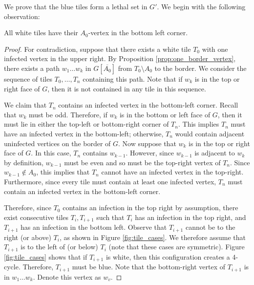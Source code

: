 We prove that the blue tiles form a lethal set in $G'$. We begin with the following observation:

\begin{prop}
\label{prop:bottom_left}
All white tiles have their $A_0$-vertex in the bottom left corner.
\end{prop}

\begin{proof}
For contradiction, suppose that there exists a white tile $T_0$ with one infected vertex in the upper right. By Proposition \ref{prop:one_border_vertex}, there exists a path $w_1\dots w_k$ in $G[\overline{A_0}]$ from $T_0 \setminus A_0$ to the border. We consider the sequence of tiles $T_0, \dots, T_n$ containing this path. Note that if $w_k$ is in the top or right face of $G$, then it is not contained in any tile in this sequence.

We claim that $T_n$ contains an infected vertex in the bottom-left corner. Recall that $w_k$ must be odd. Therefore, if $w_k$ is in the bottom or left face of $G$, then it must lie in either the top-left or bottom-right corner of $T_n$. This implies $T_n$ must have an infected vertex in the bottom-left; otherwise, $T_n$ would contain adjacent uninfected vertices on the border of $G$. Now suppose that $w_k$ is in the top or right face of $G$. In this case, $T_n$ contains $w_{k-1}$. However, since $w_{k-1}$ is adjacent to $w_k$ by definition, $w_{k-1}$ must be even and so must be the top-right vertex of $T_n$. Since $w_{k-1} \notin A_0$, this implies that $T_n$ cannot have an infected vertex in the top-right. Furthermore, since every tile must contain at least one infected vertex, $T_n$ must contain an infected vertex in the bottom-left corner.


Therefore, since $T_0$ contains an infection in the top right by assumption, there exist consecutive tiles $T_i, T_{i+1}$ such that $T_i$ has an infection in the top right, and $T_{i+1}$ has an infection in the bottom left. Observe that $T_{i+1}$ cannot be to the right (or above) $T_i$, as shown in Figure \ref{fig:tile_cases}. We therefore assume that $T_{i+1}$ is to the left of (or below) $T_i$ (note that these cases are symmetric). Figure  \ref{fig:tile_cases} shows that if $T_{i+1}$ is white, then this configuration creates a 4-cycle. Therefore, $T_{i+1}$ must be blue. Note that the bottom-right vertex of $T_{i+1}$ is in $w_1 \dots w_k$. Denote this vertex as $w_v$.


\end{proof}
